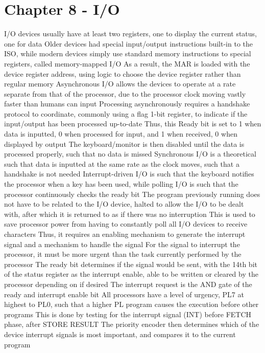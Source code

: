 \documentclass[11 pt, twoside]{article}
\newenvironment{outline*}
{
	\begin{outline}[enumerate]
	}
	{\end{outline}
}
\begin{document}
\section{Chapter 8 - I/O}
\begin{outline*}
\1 I/O devices usually have at least two registers, one to display the current status, one for data
\1 Older devices had special input/output instructions built-in to the ISO, while modern devices simply use standard memory instructions to special registers, called memory-mapped I/O
\2 As a result, the MAR is loaded with the device register address, using logic to choose the device register rather than regular memory
\1 Asynchronous I/O allows the devices to operate at a rate separate from that of the processor, due to the processor clock moving vastly faster than humans can input
\2 Processing asynchronously requires a handshake protocol to coordinate, commonly using a flag 1-bit register, to indicate if the input/output has been processed up-to-date
\3 Thus, this Ready bit is set to 1 when data is inputted, 0 when processed for input, and 1 when received, 0 when displayed by output
\3 The keyboard/monitor is then disabled until the data is processed properly, such that no data is missed
\2 Synchronous I/O is a theoretical such that data is inputted at the same rate as the clock moves, such that a handshake is not needed
\2 Interrupt-driven I/O is such that the keyboard notifies the processor when a key has been used, while polling I/O is such that the processor continuously checks the ready bit
\3 The program previously running does not have to be related to the I/O device, halted to allow the I/O to be dealt with, after which it is returned to as if there was no interruption
\3 This is used to save processor power from having to constantly poll all I/O devices to receive characters
\3 Thus, it requires an enabling mechanism to generate the interrupt signal and a mechanism to handle the signal
\4 For the signal to interrupt the processor, it must be more urgent than the task currently performed by the processor
\4 The ready bit determines if the signal would be sent, with the 14th bit of the status register as the interrupt enable, able to be written or cleared by the processor depending on if desired
\4 The interrupt request is the AND gate of the ready and interrupt enable bit
\3 All processors have a level of urgency, PL7 at highest to PL0, such that a higher PL program causes the execution before other programs
\4 This is done by testing for the interrupt signal (INT) before FETCH phase, after STORE RESULT
\4 The priority encoder then determines which of the device interrupt signals is most important, and compares it to the current program

\end{outline*}
\end{document}
